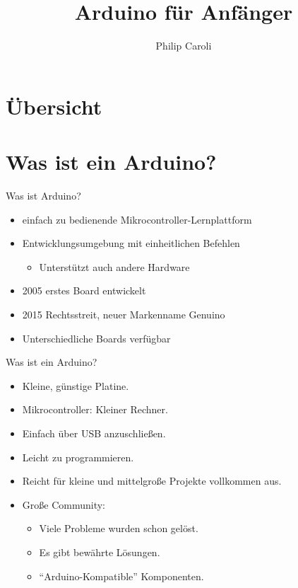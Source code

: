 \documentclass[12pt]{beamer}
\author{Philip Caroli}
\title{Arduino für Anfänger}
\begin{document}
\begin{frame}
\titlepage
\end{frame}

\section{Übersicht}
\begin{frame}
\tableofcontents
\end{frame}

\section{Was ist ein Arduino?}

\begin{frame}{Was ist Arduino?}
\begin{itemize}
\item einfach zu bedienende Mikrocontroller-Lernplattform
\item Entwicklungsumgebung mit einheitlichen Befehlen
\begin{itemize}
  \item Unterstützt auch andere Hardware
\end{itemize}
\item 2005 erstes Board entwickelt
\item 2015 Rechtsstreit, neuer Markenname Genuino
\item Unterschiedliche Boards verfügbar
\end{itemize}
\end{frame}

\begin{frame}{Was ist ein Arduino?}
\begin{itemize}
\item Kleine, günstige Platine.
\item Mikrocontroller: Kleiner Rechner.
\item Einfach über USB anzuschließen.
\item Leicht zu programmieren.
\item Reicht für kleine und mittelgroße Projekte
vollkommen aus.
\item Große Community:
\begin{itemize}
  \item Viele Probleme wurden schon gelöst.
  \item Es gibt bewährte Lösungen.
  \item “Arduino-Kompatible” Komponenten.
\end{itemize}
\end{itemize}
\end{frame}
\end{document}
